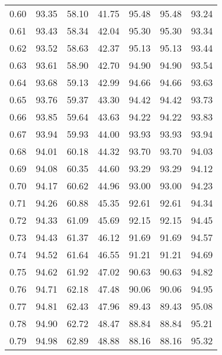 \begin{tabular}{|c|c|c|c|c|c|c|}
      0.60 &     93.35 &     58.10 &      41.75 &   95.48 &      95.48 &         93.24 \\
      0.61 &     93.43 &     58.34 &      42.04 &   95.30 &      95.30 &         93.34 \\
      0.62 &     93.52 &     58.63 &      42.37 &   95.13 &      95.13 &         93.44 \\
      0.63 &     93.61 &     58.90 &      42.70 &   94.90 &      94.90 &         93.54 \\
      0.64 &     93.68 &     59.13 &      42.99 &   94.66 &      94.66 &         93.63 \\
      0.65 &     93.76 &     59.37 &      43.30 &   94.42 &      94.42 &         93.73 \\
      0.66 &     93.85 &     59.64 &      43.63 &   94.22 &      94.22 &         93.83 \\
      0.67 &     93.94 &     59.93 &      44.00 &   93.93 &      93.93 &         93.94 \\
      0.68 &     94.01 &     60.18 &      44.32 &   93.70 &      93.70 &         94.03 \\
      0.69 &     94.08 &     60.35 &      44.60 &   93.29 &      93.29 &         94.12 \\
      0.70 &     94.17 &     60.62 &      44.96 &   93.00 &      93.00 &         94.23 \\
      0.71 &     94.26 &     60.88 &      45.35 &   92.61 &      92.61 &         94.34 \\
      0.72 &     94.33 &     61.09 &      45.69 &   92.15 &      92.15 &         94.45 \\
      0.73 &     94.43 &     61.37 &      46.12 &   91.69 &      91.69 &         94.57 \\
      0.74 &     94.52 &     61.64 &      46.55 &   91.21 &      91.21 &         94.69 \\
      0.75 &     94.62 &     61.92 &      47.02 &   90.63 &      90.63 &         94.82 \\
      0.76 &     94.71 &     62.18 &      47.48 &   90.06 &      90.06 &         94.95 \\
      0.77 &     94.81 &     62.43 &      47.96 &   89.43 &      89.43 &         95.08 \\
      0.78 &     94.90 &     62.72 &      48.47 &   88.84 &      88.84 &         95.21 \\
      0.79 &     94.98 &     62.89 &      48.88 &   88.16 &      88.16 &         95.32 \\

\end{tabular}
